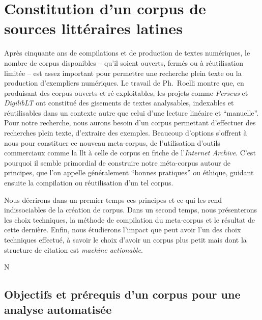 \section{Constitution d'un corpus de sources littéraires latines}

Après cinquante ans de compilations et de production de textes numériques, le nombre de corpus disponibles -- qu'il soient ouverts, fermés ou à réutilisation limitée -- est assez important pour permettre une recherche plein texte ou la production d'exempliers numériques. Le travail de Ph.~Roelli montre que, en produisant des corpus ouverts et ré-exploitables, les projets comme \textit{Perseus} et \textit{DigilibLT} ont constitué des gisements de textes analysables, indexables et réutilisables dans un contexte autre que celui d'une lecture linéaire et ``manuelle''. Pour notre recherche, nous aurons besoin d'un corpus permettant d'effectuer des recherches plein texte, d'extraire des exemples. Beaucoup d'options s'offrent à nous pour constituer ce nouveau meta-corpus, de l'utilisation d'outils commerciaux comme la \acrshort{llt} à celle de corpus en friche de l'\textit{Internet Archive}. C'est pourquoi il semble primordial de construire notre méta-corpus autour de principes, que l'on appelle généralement \enquote{bonnes pratiques} ou éthique, guidant ensuite la compilation ou réutilisation d'un tel corpus. 

Nous décrirons dans un premier temps ces principes et ce qui les rend indissociables de la création de corpus. Dans un second temps, nous présenterons les choix techniques, la méthode de compilation du meta-corpus et le résultat de cette dernière. Enfin, nous étudierons l'impact que peut avoir l'un des choix techniques effectué, à savoir le choix d'avoir un corpus plus petit mais dont la structure de citation est \textit{machine actionable}.

N%

\subsection{Objectifs et prérequis d'un corpus pour une analyse automatisée}

